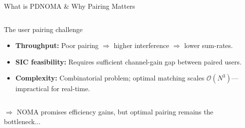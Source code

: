 \documentclass[aspectratio=169]{beamer}
\begin{document}
\begin{frame}[t]{What is PD\text{-}NOMA \& Why Pairing Matters}
\begin{columns}[t,onlytextwidth]
    \vspace{-.27cm}
  \begin{alertblock}{The user pairing challenge}
    \begin{itemize}\itemsep0.2em
      \item \textbf{Throughput:} Poor pairing $\Rightarrow$ higher interference $\Rightarrow$ lower sum-rates.
      \item \textbf{SIC feasibility:} Requires sufficient channel-gain gap between paired users.
      
      \item \textbf{Complexity:} Combinatorial problem; optimal matching scales $\mathcal{O}(N^3)$—impractical for real-time.
    \end{itemize}
  \end{alertblock}

\end{columns}

\vspace{0.2cm}
\small \textcolor{iiitblue}{$\Rightarrow$ NOMA promises efficiency gains, but optimal pairing remains the bottleneck...}
\end{frame}
\end{document}
